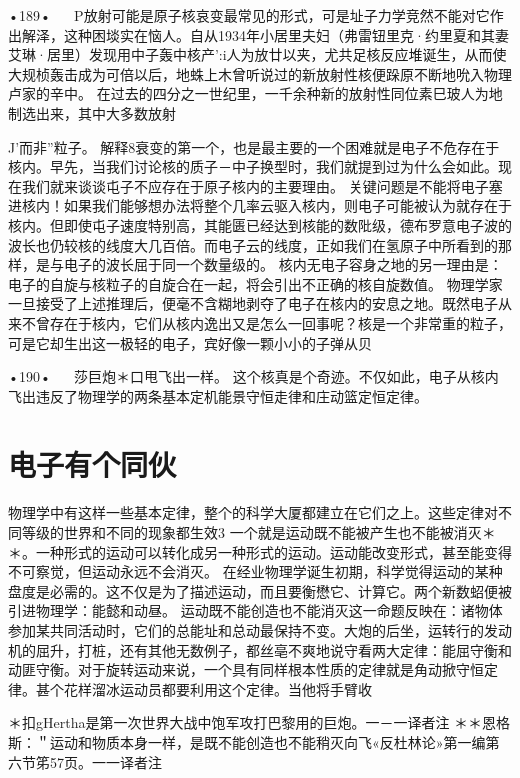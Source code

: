 •189•
  
P放射可能是原子核哀变最常见的形式，可是址子力学竞然不能对它作出解泽，这种困埮实在恼人。自从1934年小居里夫妇（弗雷钮里克·约里夏和其妻艾琳·居里）发现用中子轰中核产':i人为放廿以夹，尤共足核反应堆诞生，从而使大规桢轰击成为可倍以后，地蛛上木曾听说过的新放射性核便跺原不断地吮入物理卢家的辛中。
在过去的四分之一世纪里，一千余种新的放射性同位素巳玻人为地制选出来，其中大多数放射{J'而非”粒子。
解释8衰变的第一个，也是最主要的一个困难就是电子不危存在于核内。早先，当我们讨论核的质子－中子换型时，我们就提到过为什么会如此。现在我们就来谈谈屯子不应存在于原子核内的主要理由。
关键问题是不能将电子塞进核内！如果我们能够想办法将整个几率云驱入核内，则电子可能被认为就存在于核内。但即使屯子速度特别高，其能匮已经达到核能的数阰级，德布罗意电子波的波长也仍较核的线度大几百倍。而电子云的线度，正如我们在氢原子中所看到的那样，是与电子的波长屈于同一个数量级的。
核内无电子容身之地的另一理由是：电子的自旋与核粒子的自旋合在一起，将会引出不正确的核自旋数值。
物理学家一旦接受了上述推理后，便毫不含糊地剥夺了电子在核内的安息之地。既然电子从来不曾存在于核内，它们从核内逸出又是怎么一回事呢？核是一个非常重的粒子，可是它却生出这一极轻的电子，宾好像一颗小小的子弹从贝

•190•
  
莎巨炮＊口甩飞出一样。
这个核真是个奇迹。不仅如此，电子从核内飞出违反了物理学的两条基本定机能景守恒走律和庄动篮定恒定律。

\section{电子有个同伙}
物理学中有这样一些基本定律，整个的科学大厦都建立在它们之上。这些定律对不同等级的世界和不同的现象都生效3
一个就是运动既不能被产生也不能被消灭＊＊。一种形式的运动可以转化成另一种形式的运动。运动能改变形式，甚至能变得不可察觉，但运动永远不会消灭。
在经业物理学诞生初期，科学觉得运动的某种盘度是必需的。这不仅是为了描述运动，而且要衡懋它、计算它。两个新数蛁便被引进物理学：能懿和动昼。
运动既不能创造也不能消灭这一命题反映在：诸物体参加某共同活动时，它们的总能址和总动最保持不变。大炮的后坐，运转行的发动机的屈升，打桩，还有其他无数例子，都丝亳不爽地说守看两大定律：能屈守衡和动匪守衡。对于旋转运动来说，一个具有同样根本性质的定律就是角动掀守恒定律。甚个花样溜冰运动员都要利用这个定律。当他将手臂收

＊扣gHertha是第一次世界大战中饱军攻打巴黎用的巨炮。一－一译者注
＊＊恩格斯：＂运动和物质本身一样，是既不能创造也不能稍灭向飞«反杜林论»第一编第六节笫57页。一一译者注

}

